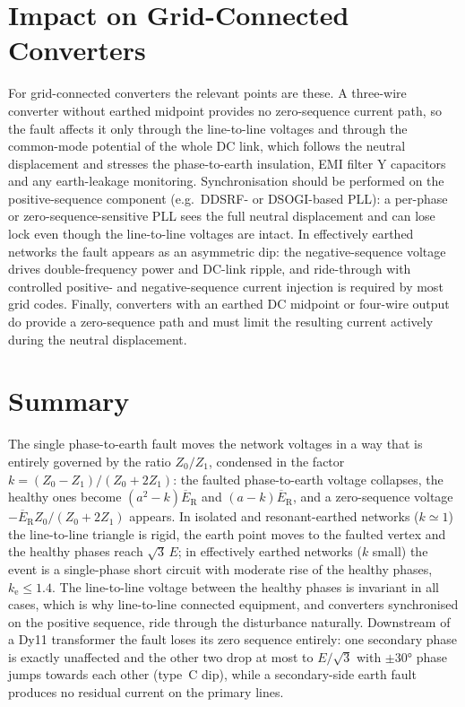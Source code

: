 \documentclass[a4paper,11pt]{article}
\newcommand{\ph}[1]{\mathrm{#1}}
\newcommand{\pE}[1]{\overline{E}_{\ph{#1}}}
\begin{document}
\section{Impact on Grid-Connected Converters}
\label{sec:converters}

For grid-connected converters the relevant points are these. A three-wire
converter without earthed midpoint provides no zero-sequence current path, so
the fault affects it only through the line-to-line voltages and through the
common-mode potential of the whole DC link, which follows the neutral
displacement and stresses the phase-to-earth insulation, EMI filter Y
capacitors and any earth-leakage monitoring. Synchronisation should be
performed on the positive-sequence component (e.g.\ DDSRF- or DSOGI-based
PLL): a per-phase or zero-sequence-sensitive PLL sees the full neutral
displacement and can lose lock even though the line-to-line voltages are
intact. In effectively earthed networks the fault appears as an asymmetric
dip: the negative-sequence voltage drives double-frequency power and DC-link
ripple, and ride-through with controlled positive- and negative-sequence
current injection is required by most grid codes. Finally, converters with an
earthed DC midpoint or four-wire output do provide a zero-sequence path and
must limit the resulting current actively during the neutral displacement.

\section{Summary}

The single phase-to-earth fault moves the network voltages in a way that is
entirely governed by the ratio $Z_{0}/Z_{1}$, condensed in the factor
$k=(Z_{0}-Z_{1})/(Z_{0}+2Z_{1})$: the faulted phase-to-earth voltage
collapses, the healthy ones become $(a^{2}-k)\pE{R}$ and $(a-k)\pE{R}$, and a
zero-sequence voltage $-\pE{R}Z_{0}/(Z_{0}+2Z_{1})$ appears. In isolated and
resonant-earthed networks ($k\simeq 1$) the line-to-line triangle is rigid,
the earth point moves to the faulted vertex and the healthy phases reach
$\sqrt{3}\,E$; in effectively earthed networks ($k$ small) the event is a
single-phase short circuit with moderate rise of the healthy phases,
$k_\mathrm{e}\le 1.4$. The line-to-line voltage between the healthy phases is
invariant in all cases, which is why line-to-line connected equipment, and
converters synchronised on the positive sequence, ride through the
disturbance naturally. Downstream of a Dy11 transformer the fault loses its
zero sequence entirely: one secondary phase is exactly unaffected and the
other two drop at most to $E/\sqrt{3}$ with $\pm\ang{30}$ phase jumps towards
each other (type~C dip), while a secondary-side earth fault produces no
residual current on the primary lines.
\end{document}
